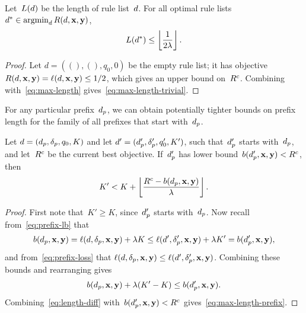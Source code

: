 \begin{corollary}
\label{cor:ub-prefix-length}
Let~$L({d})$ be the length of rule list~${d}$.
%
For all optimal rule lists ${d^* \in \operatorname*{argmin}_{d} R({d}, \mathbf{x}, \mathbf{y})}$,
\begin{align}
L(\OptimalRL) \le \left\lfloor \frac{1}{2\Reg} \right\rfloor.
\label{eq:max-length-trivial}
\end{align}
\end{corollary}

\begin{proof}
Let ${d = ((), (), q_0, 0)}$ be the empty rule list;
it has objective ${R({d}, \mathbf{x}, \mathbf{y}) = \ell({d}, \mathbf{x}, \mathbf{y}) \le 1/2}$,
which gives an upper bound on~${R^c}$.
%
Combining with~\eqref{eq:max-length} gives~\eqref{eq:max-length-trivial}.
\end{proof}

For any particular prefix~$d_p$, we can obtain potentially tighter bounds on
prefix length for the family of all prefixes that start with~$d_p$.

\begin{theorem}
\label{thm:ub-prefix-specific}
Let ${{d} = (d_p, \delta_p, q_0, K)}$
and let ${{d}' = (d_p', \delta_p', q_0', K')}$,
such that~$d_p'$ starts with~$d_p$,
and let~${R^c}$ be the current best objective.
%
If~$d_p'$ has lower bound~${b(d_p', \mathbf{x}, \mathbf{y}) < {R^c}}$, then
\begin{align}
K' < K + \left\lfloor \frac{\CurrentObj - b(\Prefix, \x, \y)}{\Reg} \right\rfloor.
\label{eq:max-length-prefix}
\end{align}
\end{theorem}

\begin{proof}
First note that~${K' \ge K}$, since~$d_p'$ starts with~$d_p$.
%
Now recall from~\eqref{eq:prefix-lb} that
%
\begin{align}
b(\Prefix, \x, \y) = \Loss(\RL, \Labels, \x, \y) + \Reg K
\le \Loss(\RL', \Labels', \x, \y) + \Reg K' = b(\Prefix', \x, \y),
\end{align}
%
and from~\eqref{eq:prefix-loss} that
${\ell({d}, \delta_p, \mathbf{x}, \mathbf{y}) \le \ell({d}', \delta_p', \mathbf{x}, \mathbf{y})}$.
%
Combining these bounds and rearranging gives
\begin{align}
b(\Prefix, \x, \y) + \Reg (K' - K) \le b(\Prefix', \x, \y).
\label{eq:length-diff}
\end{align}
Combining~\eqref{eq:length-diff} with~${b(d_p', \mathbf{x}, \mathbf{y}) < {R^c}}$
gives~\eqref{eq:max-length-prefix}.
\end{proof}


